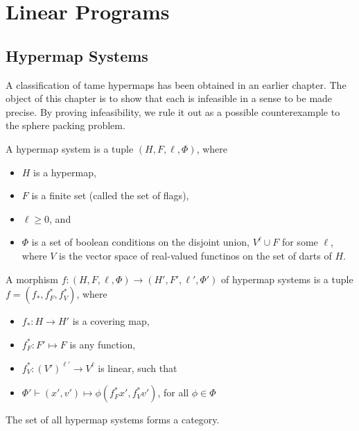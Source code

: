 \chapter{Linear Programs}
    \label{sec:lp}


\section{Hypermap Systems}

A classification of tame hypermaps has been obtained in an earlier
chapter.  The object of this chapter is to show that each is infeasible
in a sense to be made precise.  By proving infeasibility, we rule
it out as a possible counterexample to the sphere packing problem.


\begin{definition}
A hypermap system is a tuple $(H,F,\ell,\Phi)$, where 
\begin{itemize}
\item $H$ is a
hypermap, 
\item $F$ is a finite set (called the set of flags), 
\item $\ell\ge 0$, and 
\item $\Phi$ is a set of boolean conditions on the
disjoint union, $V^\ell\cup F$ for some $\ell$, where $V$
is the vector space of real-valued functinos on the set of darts of $H$.
\end{itemize}
\end{definition}

\begin{definition}
A morphism $f:(H,F,\ell,\Phi)\to (H',F',\ell',\Phi')$
of hypermap systems is a tuple 
$f=(f_*,f_F^*,f_V^*)$, where
\begin{itemize}
\item $f_*:H\to H'$ is a covering map,
\item $f_F^*:F'\mapsto F$ is any function,
\item $f_V^*:(V')^{\ell'}\to V^\ell$ is linear, such that
\item $\Phi' \vdash (x',v')\mapsto \phi(f_F^*x',f_V^*v')$, for
all $\phi\in\Phi$
\end{itemize}
\end{definition}

The set of all hypermap systems forms a category.



